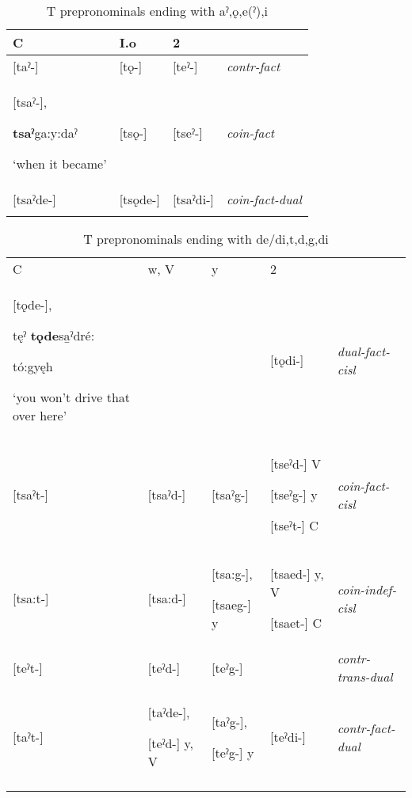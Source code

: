 
\begin{table}
\caption{T prepronominals ending with aˀ,ǫ,e(ˀ),i}
\label{tab:1:contrcoinfactdual}
\scriptsize{
\begin{tabularx}{\textwidth}{XXXX}
\lsptoprule
C & I.o & 2 & \\
\midrule
{}[taˀ-] & [tǫ-] & [teˀ-] & {\itshape contr-fact}\\
{}[tsaˀ-], 

\textbf{tsaˀ}ga:y\’{ę}:daˀ 

‘when it became’ & [tsǫ-] & [tseˀ-] & {\itshape coin-fact}\\
{}[tsaˀde-] & [tsǫde-] & [tsaˀdi-] & {\itshape coin-fact-dual}\\
\lspbottomrule
\end{tabularx}}
\end{table}



\begin{table}
\caption{T prepronominals ending with de/di,t,d,g,di}
\label{tab:1:othercisldual}
\scriptsize{
\begin{tabularx}{\textwidth}{XXXXX}
\lsptoprule
C & w, V & y & 2 & \\
{}[tǫde-], 

tęˀ \textbf{tǫde}sa̱ˀdré:

tó:gyęh 

‘you won’t drive that over here’ &  &  & [tǫdi-] & {\itshape dual-fact-cisl}\\
{}[tsaˀt-] & [tsaˀd-] & [tsaˀg-] & [tseˀd-] V 

{}[tseˀg-] y 

{}[tseˀt-] C & {\itshape coin-fact-cisl}\\
{}[tsa:t-] & [tsa:d-] & [tsa:g-], 

[tsaeg-] y & [tsaed-] y, V 

[tsaet-] C & {\itshape coin-indef-cisl}\\
{}[teˀt-] & [teˀd-] & [teˀg-] &  & {\itshape contr-trans-dual}\\
{}[taˀt-] & [taˀde-], 

{} [teˀd-] y, V & [taˀg-], 

{}[teˀg-] y & [teˀdi-] & {\itshape contr-fact-dual}\\
\lspbottomrule
\end{tabularx}}
\end{table}



